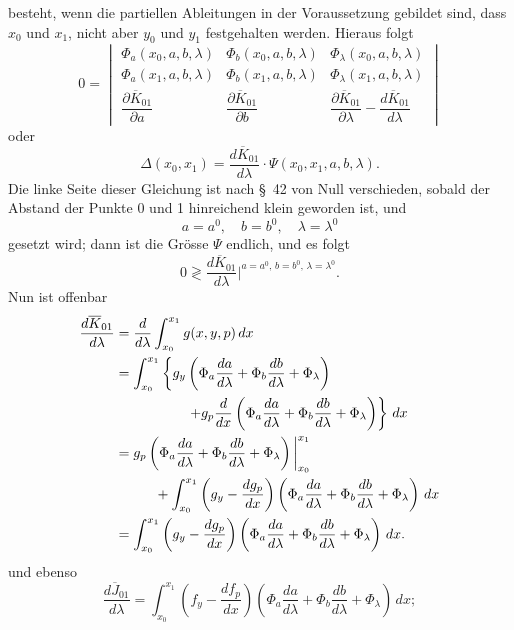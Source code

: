 \documentclass[11pt,a4paper,leqno]{article}
\begin{document}
besteht, wenn die partiellen Ableitungen in der Voraussetzung gebildet sind, dass $x_0$ und $x_1$, nicht aber $y_0$ und $y_1$ festgehalten werden. Hieraus folgt
\[
0=\begin{vmatrix}
\Phi_a(x_0,a,b,\lambda)&\Phi_b(x_0,a,b,\lambda)&\Phi_\lambda(x_0,a,b,\lambda)\\
\Phi_a(x_1,a,b,\lambda)&\Phi_b(x_1,a,b,\lambda)&\Phi_\lambda(x_1,a,b,\lambda)\\
\dfrac{\partial\overline{K}_{01}}{\partial a}&\dfrac{\partial\overline{K}_{01}}{\partial b}&\dfrac{\partial\overline{K}_{01}}{\partial\lambda}-\dfrac{d\overline{K}_{01}}{d\lambda}
\end{vmatrix}
\]
oder
\[
\Delta(x_0,x_1)=\frac{d\overline{K}_{01}}{d\lambda}\cdot\Psi(x_0,x_1,a,b,\lambda).
\]
Die linke Seite dieser Gleichung ist nach \S~42 von Null verschieden, sobald der Abstand der Punkte 0 und 1 hinreichend klein geworden ist, und
\begin{equation}\tag{7}
a=a^0,\quad b=b^0,\quad \lambda=\lambda^0
\end{equation}
gesetzt wird; dann ist die Grösse $\Psi$ endlich, und es folgt
\begin{equation}\tag{8}
0\gtrless \frac{d\overline{K}_{01}}{d\lambda}\bigg|^{a=a^0,\,b=b^0,\,\lambda=\lambda^0}.
\end{equation}
Nun ist offenbar
\[
\begin{aligned}
\frac{d\overline{K}_{01}}{d\lambda}
&=\frac{d}{d\lambda}\int_{x_0}^{x_1}g(x,y,p)\,dx \\
&=\int_{x_0}^{x_1}\left\{g_y\left(\Phi_a\frac{da}{d\lambda}+\Phi_b\frac{db}{d\lambda}+\Phi_\lambda\right)\right.\\
&\hspace{18mm}\left.+g_p\frac{d}{dx}\left(\Phi_a\frac{da}{d\lambda}+\Phi_b\frac{db}{d\lambda}+\Phi_\lambda\right)\right\}\,dx \\
&=g_p\left(\Phi_a\frac{da}{d\lambda}+\Phi_b\frac{db}{d\lambda}+\Phi_\lambda\right)\bigg|_{x_0}^{x_1}\\
&\hspace{10mm}+\int_{x_0}^{x_1}\left(g_y-\frac{dg_p}{dx}\right)
\left(\Phi_a\frac{da}{d\lambda}+\Phi_b\frac{db}{d\lambda}+\Phi_\lambda\right)\,dx \\
&=\int_{x_0}^{x_1}\left(g_y-\frac{dg_p}{dx}\right)
\left(\Phi_a\frac{da}{d\lambda}+\Phi_b\frac{db}{d\lambda}+\Phi_\lambda\right)\,dx.
\end{aligned}
\]
und ebenso
\[
\frac{d\overline{J}_{01}}{d\lambda}
=\int_{x_0}^{x_1}\left(f_y-\frac{df_p}{dx}\right)
\left(\Phi_a\frac{da}{d\lambda}+\Phi_b\frac{db}{d\lambda}+\Phi_\lambda\right)\,dx;
\]
\end{document}
